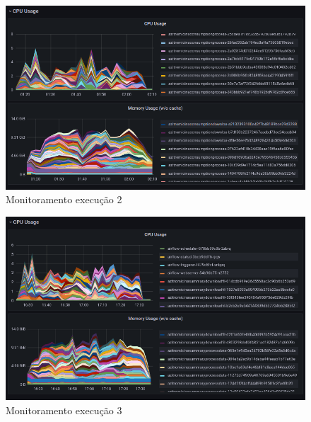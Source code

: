 \documentclass[10pt,brazil]{beamer}
\theoremstyle{definition}
\begin{document}
\begin{frame}[plain]
  \hspace*{-10mm}
    \begin{figure}
    \centering  
  \includegraphics[width=.75\paperwidth]{etl_2_usage.png}
      \caption[Monitoramento execução 2]{Monitoramento execução 2}
  \end{figure}  
\end{frame}

\begin{frame}[plain]
  \hspace*{-10mm}
    \begin{figure}
    \centering  
  \includegraphics[width=.75\paperwidth]{etl_3_usage.png}
      \caption[Monitoramento execução 3]{Monitoramento execução 3}
  \end{figure}  
\end{frame}
\end{document}
